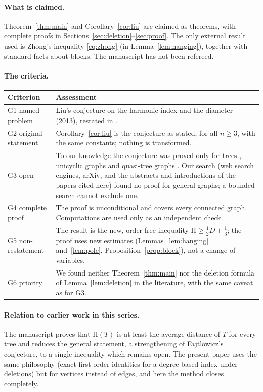 \documentclass[11pt]{article}
\theoremstyle{definition}
\theoremstyle{remark}
\newcommand{\Hm}{\mathrm{H}}
\newcommand{\D}{D}
\begin{document}
\paragraph{What is claimed.} Theorem~\ref{thm:main} and Corollary~\ref{cor:liu} are claimed
as theorems, with complete proofs in Sections~\ref{sec:deletion}--\ref{sec:proof}. The only
external result used is Zhong's inequality \eqref{eq:zhong} (in Lemma~\ref{lem:hanging}),
together with standard facts about blocks. The manuscript has not been refereed.

\paragraph{The criteria.}
\begin{center}
\begin{tabular}{@{}lp{}@{}}
\toprule
Criterion & Assessment\\
\midrule
G1 named problem & Liu's conjecture on the harmonic index and the diameter \cite{Liu} (2013), restated in \cite{JM1,JM2,AI}.\\
G2 original statement & Corollary~\ref{cor:liu} is the conjecture as stated, for all $n\ge3$, with the same constants; nothing is transformed.\\
G3 open & To our knowledge the conjecture was proved only for trees \cite{Liu}, unicyclic graphs \cite{JM1,JM2} and quasi-tree graphs \cite{AI}. Our search (web search engines, arXiv, and the abstracts and introductions of the papers cited here) found no proof for general graphs; a bounded search cannot exclude one.\\
G4 complete proof & The proof is unconditional and covers every connected graph. Computations are used only as an independent check.\\
G5 non-restatement & The result is the new, order-free inequality $\Hm\ge\frac12\D+\frac13$; the proof uses new estimates (Lemmas~\ref{lem:hanging} and~\ref{lem:pole}, Proposition~\ref{prop:block}), not a change of variables.\\
G6 priority & We found neither Theorem~\ref{thm:main} nor the deletion formula of Lemma~\ref{lem:deletion} in the literature, with the same caveat as for G3.\\
\bottomrule
\end{tabular}
\end{center}

\paragraph{Relation to earlier work in this series.} The manuscript \cite{VMRC} proves that
$\Hm(T)$ is at least the average distance of $T$ for every tree and reduces the general
statement, a strengthening of Fajtlowicz's conjecture, to a single inequality which remains
open. The present paper uses the same philosophy (exact first-order identities for a
degree-based index under deletions) but for vertices instead of edges, and here the method
closes completely.
\end{document}
